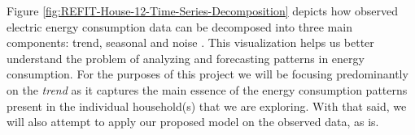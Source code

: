\begin{figure}[hbt!]
        \begin{adjustwidth}{-3.0cm}{-3.0cm}%
                \myfloatalign
                 \quad
                 \quad
                \caption{}
                \label{fig:REFIT-Distribution}
        \end{adjustwidth}
\end{figure}

\noindent \newline Figure \ref{fig:REFIT-House-12-Time-Series-Decomposition} depicts how observed electric energy consumption data can be decomposed into three main components: trend, seasonal and noise \cite{Chujai}. This visualization helps us better understand the problem of analyzing and forecasting patterns in energy consumption. For the purposes of this project we will be focusing predominantly on the \textit{trend} as it captures the main essence of the energy consumption patterns present in the individual household(s) that we are exploring. With that said, we will also attempt to apply our proposed model on the observed data, as is.

